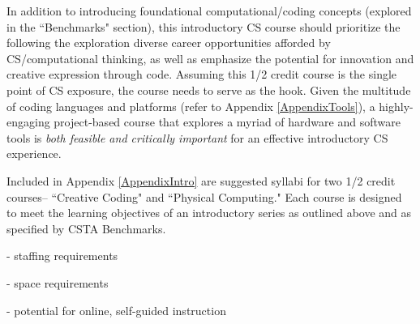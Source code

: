 In addition to introducing foundational computational/coding concepts (explored in the ``Benchmarks" section), this introductory CS course should prioritize the following the exploration diverse career opportunities afforded by CS/computational thinking, as well as emphasize the potential for innovation and creative expression through code. Assuming this 1/2 credit course is the single point of CS exposure, the course needs to serve as the hook. Given the multitude of coding languages and platforms (refer to Appendix \ref{AppendixTools}), a highly-engaging project-based course that explores a myriad of hardware and software tools is \textit{both feasible and critically important} for an effective introductory CS experience. \par
Included in Appendix \ref{AppendixIntro} are suggested syllabi for two 1/2 credit courses-- ``Creative Coding" and ``Physical Computing." Each course is designed to meet the learning objectives of an introductory series as outlined above and as specified by CSTA Benchmarks. \par
- staffing requirements \par
- space requirements \par
- potential for online, self-guided instruction \par